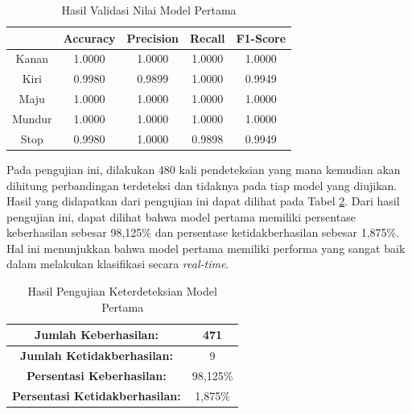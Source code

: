   \begin{table}[H]
    \centering
    \caption{Hasil Validasi Nilai Model Pertama}
    \label{tb:Hasil Validasi Nilai Model Pertama}
  \begin{tabular}{|c|c|c|c|c|}
    \hline
    \rowcolor[HTML]{9B9B9B} 
    \cellcolor[HTML]{9B9B9B} & Accuracy & Precision & Recall & F1-Score \\ \hline
    Kanan                    & 1.0000    & 1.0000    & 1.0000 & 1.0000   \\ \hline
    Kiri                     & 0.9980    & 0.9899    & 1.0000 & 0.9949   \\ \hline
    Maju                     & 1.0000    & 1.0000    & 1.0000 & 1.0000   \\ \hline
    Mundur                   & 1.0000    & 1.0000    & 1.0000 & 1.0000   \\ \hline
    Stop                     & 0.9980    & 1.0000    & 0.9898 & 0.9949   \\ \hline
    \end{tabular}
    \end{table}


Pada pengujian ini, dilakukan 480 kali pendeteksian yang mana kemudian akan dihitung perbandingan terdeteksi dan tidaknya pada tiap model yang diujikan. Hasil yang didapatkan dari pengujian ini dapat dilihat pada Tabel \ref{tb:Hasil Pengujian Keterdeteksian Model Pertama}. Dari hasil pengujian ini, dapat dilihat bahwa model pertama memiliki persentase keberhasilan sebesar 98,125\% dan persentase ketidakberhasilan sebesar 1,875\%. Hal ini menunjukkan bahwa model pertama memiliki performa yang sangat baik dalam melakukan klasifikasi secara \emph{real-time}.

    \begin{longtable}{|c|c|}
      \caption{Hasil Pengujian Keterdeteksian Model Pertama}
      \label{tb:Hasil Pengujian Keterdeteksian Model Pertama}   \\
      \hline
      \cellcolor[HTML]{C0C0C0}
      \textbf{Jumlah Keberhasilan:} & 471\\
      \hline
      \cellcolor[HTML]{C0C0C0}
      \textbf{Jumlah Ketidakberhasilan:} & 9\\
      \hline
      \cellcolor[HTML]{C0C0C0}
      \textbf{Persentasi Keberhasilan:} & 98,125\% \\
      \hline
      \cellcolor[HTML]{C0C0C0}
      \textbf{Persentasi Ketidakberhasilan:} & 1,875\% \\
      \hline
      \end{longtable}
    
